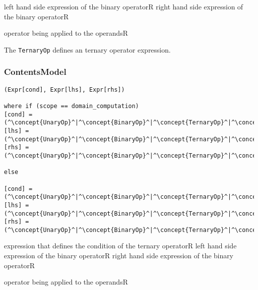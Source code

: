 \begin{HIRChildElements}
	\HIRElementDef{[lhs]}
	{left hand side expression of the binary operator}{R}
	\HIRElementDef{[rhs]}
	{right hand side expression of the binary operator}{R}
\end{HIRChildElements}

\begin{HIRAttributes}
	{operator being applied to the operands}{R}
\end{HIRAttributes}


The {\tt TernaryOp} defines an ternary operator expression.

\subsubsection*{ContentsModel}{}

\begin{lstlisting}[style=default]
(Expr[cond], Expr[lhs], Expr[rhs])

where if (scope == domain_computation)
[cond] = (^\concept{UnaryOp}^|^\concept{BinaryOp}^|^\concept{TernaryOp}^|^\concept{FieldAccess}^|^\concept{VarAccess}^|^\concept{Literal}^)
[lhs] = (^\concept{UnaryOp}^|^\concept{BinaryOp}^|^\concept{TernaryOp}^|^\concept{FieldAccess}^|^\concept{VarAccess}^|^\concept{Literal}^),
[rhs] =	(^\concept{UnaryOp}^|^\concept{BinaryOp}^|^\concept{TernaryOp}^|^\concept{FieldAccess}^|^\concept{VarAccess}^|^\concept{Literal}^)

else

[cond] = (^\concept{UnaryOp}^|^\concept{BinaryOp}^|^\concept{TernaryOp}^|^\concept{VarAccess}^|^\concept{Literal}^)
[lhs] = (^\concept{UnaryOp}^|^\concept{BinaryOp}^|^\concept{TernaryOp}^|^\concept{VarAccess}^|^\concept{Literal}^)
[rhs] = (^\concept{UnaryOp}^|^\concept{BinaryOp}^|^\concept{TernaryOp}^|^\concept{VarAccess}^|^\concept{Literal}^)
\end{lstlisting}

\begin{HIRChildElements}
	\HIRElementDef{[cond]}
	{expression that defines the condition of the ternary operator}{R}
	\HIRElementDef{[lhs]}
	{left hand side expression of the binary operator}{R}
	\HIRElementDef{[rhs]}
	{right hand side expression of the binary operator}{R}
\end{HIRChildElements}

\begin{HIRAttributes}
	{operator being applied to the operands}{R}
\end{HIRAttributes}


